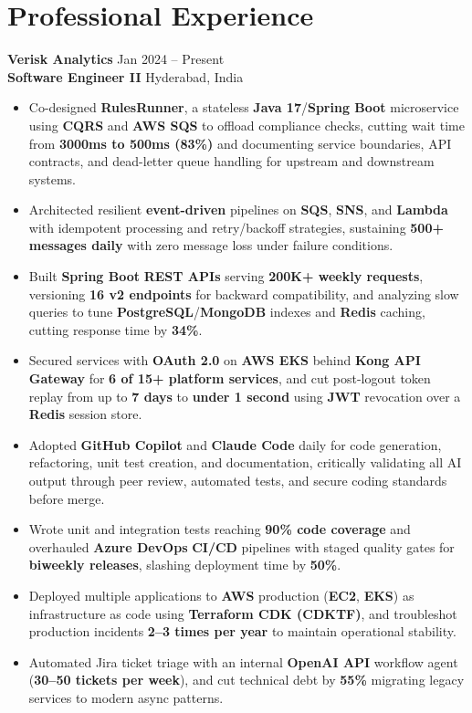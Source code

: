 \documentclass[a4paper,10pt]{article}
\begin{document}
\section*{Professional Experience}

\textbf{Verisk Analytics} \hfill Jan 2024 -- Present \\
\textbf{Software Engineer II} \hfill Hyderabad, India

\begin{itemize}[leftmargin=*]
    \item Co-designed \textbf{RulesRunner}, a stateless \textbf{Java 17}/\textbf{Spring Boot} microservice using \textbf{CQRS} and \textbf{AWS SQS} to offload compliance checks, cutting wait time from \textbf{3000ms to 500ms (83\%)} and documenting service boundaries, API contracts, and dead-letter queue handling for upstream and downstream systems.
    \item Architected resilient \textbf{event-driven} pipelines on \textbf{SQS}, \textbf{SNS}, and \textbf{Lambda} with idempotent processing and retry/backoff strategies, sustaining \textbf{500+ messages daily} with zero message loss under failure conditions.
    \item Built \textbf{Spring Boot} \textbf{REST APIs} serving \textbf{200K+ weekly requests}, versioning \textbf{16 v2 endpoints} for backward compatibility, and analyzing slow queries to tune \textbf{PostgreSQL}/\textbf{MongoDB} indexes and \textbf{Redis} caching, cutting response time by \textbf{34\%}.
    \item Secured services with \textbf{OAuth 2.0} on \textbf{AWS EKS} behind \textbf{Kong API Gateway} for \textbf{6 of 15+ platform services}, and cut post-logout token replay from up to \textbf{7 days} to \textbf{under 1 second} using \textbf{JWT} revocation over a \textbf{Redis} session store.
    \item Adopted \textbf{GitHub Copilot} and \textbf{Claude Code} daily for code generation, refactoring, unit test creation, and documentation, critically validating all AI output through peer review, automated tests, and secure coding standards before merge.
    \item Wrote unit and integration tests reaching \textbf{90\% code coverage} and overhauled \textbf{Azure DevOps} \textbf{CI/CD} pipelines with staged quality gates for \textbf{biweekly releases}, slashing deployment time by \textbf{50\%}.
    \item Deployed multiple applications to \textbf{AWS} production (\textbf{EC2}, \textbf{EKS}) as infrastructure as code using \textbf{Terraform CDK (CDKTF)}, and troubleshot production incidents \textbf{2--3 times per year} to maintain operational stability.
    \item Automated Jira ticket triage with an internal \textbf{OpenAI API} workflow agent (\textbf{30--50 tickets per week}), and cut technical debt by \textbf{55\%} migrating legacy services to modern async patterns.
\end{itemize}
\end{document}

